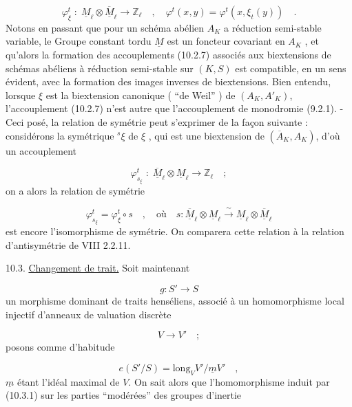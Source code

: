 \begin{equation}\tag{10.2.7}
\varphi^t_\xi \; : \; \underline{M}_\ell \otimes \overline{\underline{M}}_\ell \longrightarrow \mathbb{Z}_\ell \quad , \quad \varphi^t(x,y) = \varphi^t(x,\xi_t(y)) \quad .
\end{equation}
Notons en passant que pour un schéma abélien $A_K$ a réduction semi-stable variable, le Groupe constant tordu $\underline{M}$ est un foncteur covariant en $A_K$ , et qu'alors la formation des accouplements (10.2.7) associés aux biextensions de schémas abéliens à réduction semi-stable sur $(K,S)$ est compatible, en un sens évident, avec la formation des images inverses de biextensions. Bien entendu, lorsque $\xi$ est la biextension canonique ( ``de Weil'' ) de $(A_K , A'_K)$, l'accouplement (10.2.7) n'est autre que l'accouplement de monodromie (9.2.1). - Ceci posé, la relation de symétrie peut s'exprimer de la façon suivante : considérons la symétrique ${}^{s}\xi$ de $\xi$ , qui est une biextension de $(\overline{A}_K,A_K)$, d'où un accouplement

\begin{equation*}
\varphi^t_{s_\xi} \; : \; \overline{\underline{M}}_\ell \otimes \underline{M}_\ell \longrightarrow \mathbb{Z}_\ell \quad ;
\end{equation*}
on a alors la relation de symétrie

\begin{equation}\tag{10.2.8}
\varphi^t_{s_\xi} = \varphi^t_\xi \circ s \quad , \quad \text{où} \quad s: \overline{\underline{M}}_\ell \otimes \underline{M}_\ell \xrightarrow{\ \sim\ } \underline{M}_\ell \otimes \overline{\underline{M}}_\ell
\end{equation}
est encore l'isomorphisme de symétrie. On comparera cette relation à la relation d'antisymétrie de VIII 2.2.11.




10.3. \underline{Changement de trait.} Soit maintenant

\begin{equation}\tag{10.3.1}
g: S' \longrightarrow S
\end{equation}
un morphisme dominant de traits henséliens, associé à un homomorphisme local injectif d'anneaux de valuation discrète

\begin{equation*}
V \longrightarrow V' \quad ;
\end{equation*}
posons comme d'habitude

\begin{equation}\tag{10.3.2}
e(S'/S) = \mathrm{long}_V V'/\underline{m}V' \quad ,
\end{equation}
$\underline{m}$ étant l'idéal maximal de $V$. On sait alors que l'homomorphisme induit par (10.3.1) sur les parties ``modérées'' des groupes d'inertie

